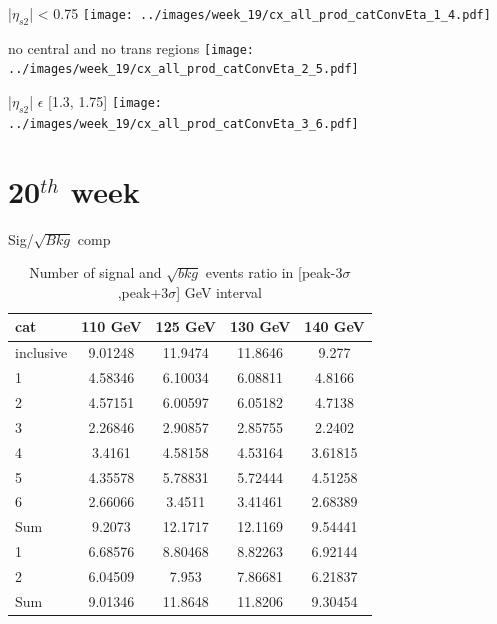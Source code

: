 \documentclass[10pt,UKenglish, leqno, xcolor = dvipsnames]{beamer}
\begin{document}
		\begin{frame}{|$\eta_{s2}$| < 0.75}
			\vfill
			\centering
			\texttt{[image: ../images/week\_19/cx\_all\_prod\_catConvEta\_1\_4.pdf]}
			\vfill
		\end{frame}
	
		\begin{frame}{no central and no trans regions}
			\vfill
			\centering
			\texttt{[image: ../images/week\_19/cx\_all\_prod\_catConvEta\_2\_5.pdf]}
			\vfill
		\end{frame}
	
		\begin{frame}{|$\eta_{s2}$| $\epsilon$ [1.3, 1.75]}
			\vfill
			\centering
			\texttt{[image: ../images/week\_19/cx\_all\_prod\_catConvEta\_3\_6.pdf]}
			\vfill
		\end{frame}

	\section{20$^{th}$ week}
	\SectionPage
		
		\begin{frame}{Sig/$\sqrt{Bkg}$ comp}
			\vfill
			\begin{table}[tbp]
				\centering
				\begin{tabular}{lcccc}
					\toprule[1.5pt]
					cat & 110 GeV	& 125 GeV	& 130 GeV	& 140 GeV	\\
					\midrule
					inclusive & 9.01248 & 11.9474 & 11.8646 & 9.277 \\
					\midrule
					1 & 4.58346 & 6.10034 & 6.08811 & 4.8166 \\
					2 & 4.57151 & 6.00597 & 6.05182 & 4.7138 \\
					3 & 2.26846 & 2.90857 & 2.85755 & 2.2402 \\
					4 & 3.4161 & 4.58158 & 4.53164 & 3.61815 \\
					5 & 4.35578 & 5.78831 & 5.72444 & 4.51258 \\ 
					6 & 2.66066 & 3.4511 & 3.41461 & 2.68389 \\
					Sum & 9.2073 & 12.1717 & 12.1169 & 9.54441 \\
					\midrule
					1 & 6.68576 & 8.80468 & 8.82263 & 6.92144 \\ 
					2 & 6.04509 & 7.953 & 7.86681 & 6.21837 \\
					Sum & 9.01346 & 11.8648 & 11.8206 & 9.30454 \\
					\bottomrule[1.5pt]
				\end{tabular}
				\caption{Number of signal and $\sqrt{bkg}$ events ratio in [peak-3$\sigma$,peak+3$\sigma$] GeV interval}
			\end{table}
			\vfill
		\end{frame}
	
\end{document}
